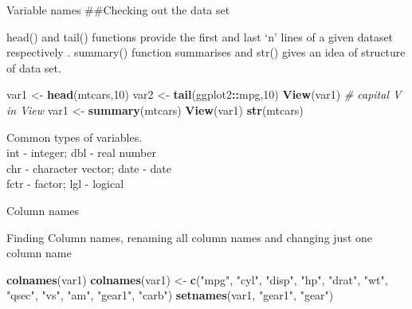 \documentclass[ignorenonframetext,]{beamer}
\newenvironment{Shaded}{\begin{snugshade}}{\end{snugshade}}
\newcommand{\CommentTok}[1]{\textcolor[rgb]{0.56,0.35,0.01}{\textit{#1}}}
\newcommand{\DecValTok}[1]{\textcolor[rgb]{0.00,0.00,0.81}{#1}}
\newcommand{\KeywordTok}[1]{\textcolor[rgb]{0.13,0.29,0.53}{\textbf{#1}}}
\newcommand{\NormalTok}[1]{#1}
\newcommand{\OperatorTok}[1]{\textcolor[rgb]{0.81,0.36,0.00}{\textbf{#1}}}
\newcommand{\StringTok}[1]{\textcolor[rgb]{0.31,0.60,0.02}{#1}}
\begin{document}
\begin{frame}[fragile]{Variable names}
\#\#Checking out the data set

head() and tail() functions provide the first and last `n' lines of a
given dataset respectively . summary() function summarises and str()
gives an idea of structure of data set.

\begin{Shaded}
\begin{Highlighting}[]
\NormalTok{var1 <-}\StringTok{ }\KeywordTok{head}\NormalTok{(mtcars,}\DecValTok{10}\NormalTok{) }
\NormalTok{var2 <-}\StringTok{ }\KeywordTok{tail}\NormalTok{(ggplot2}\OperatorTok{::}\NormalTok{mpg,}\DecValTok{10}\NormalTok{)}
\KeywordTok{View}\NormalTok{(var1) }\CommentTok{# capital V in View}
\NormalTok{var1 <-}\StringTok{ }\KeywordTok{summary}\NormalTok{(mtcars)}
\KeywordTok{View}\NormalTok{(var1)}
\KeywordTok{str}\NormalTok{(mtcars)}
\end{Highlighting}
\end{Shaded}

Common types of variables.\\
int - integer; dbl - real number\\
chr - character vector; date - date\\
fctr - factor; lgl - logical

\end{frame}

\begin{frame}[fragile]{Column names}
\protect\hypertarget{column-names}{}

Finding Column names, renaming all column names and changing just one
column name

\begin{Shaded}
\begin{Highlighting}[]
\KeywordTok{colnames}\NormalTok{(var1)}
\KeywordTok{colnames}\NormalTok{(var1) <-}\StringTok{ }\KeywordTok{c}\NormalTok{(}\StringTok{"mpg"}\NormalTok{, }\StringTok{"cyl"}\NormalTok{, }\StringTok{"disp"}\NormalTok{, }\StringTok{"hp"}\NormalTok{, }\StringTok{"drat"}\NormalTok{, }
                \StringTok{"wt"}\NormalTok{, }\StringTok{"qsec"}\NormalTok{, }\StringTok{"vs"}\NormalTok{, }\StringTok{"am"}\NormalTok{, }\StringTok{"gear1"}\NormalTok{, }\StringTok{"carb"}\NormalTok{)}
\KeywordTok{setnames}\NormalTok{(var1, }\StringTok{"gear1"}\NormalTok{, }\StringTok{"gear"}\NormalTok{)}
\end{Highlighting}
\end{Shaded}

\end{frame}
\end{document}
